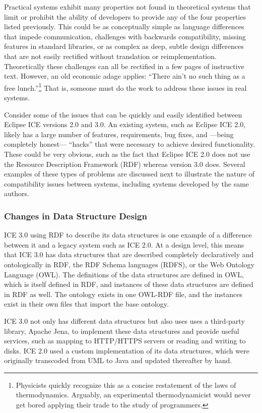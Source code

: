 Practical systems exhibit many properties not found in theoretical systems that
limit or prohibit the ability of developers to provide any of the four
properties listed previously. This could be as conceptually simple as language
differences that impede communication, challenges with backwards compatibility,
missing features in standard libraries, or as complex as deep, subtle design
differences that are not easily rectified without translation or
reimplementation. Theoretically these challenges can all be rectified in a few
pages of instructive text. However, an old economic adage applies:
``There ain't no such thing as a free lunch.''\footnote{Physicists quickly recognize this as a concise
restatement of the laws of thermodynamics. Arguably, an experimental
thermodynamicist would never get bored applying their trade to the study of
programmers.} That is, someone must do the work to address these issues in real
systems.

Consider some of the issues that can be quickly and easily identified between
Eclipse ICE versions 2.0 and 3.0. An existing system, such as Eclipse ICE 2.0,
likely has a large number of features, requirements, bug fixes, and ---being completely
honest--- ``hacks'' that were necessary to achieve desired functionality. These
could be very obvious, such as the fact that Eclipse ICE 2.0 does not use the Resource
Description Framework (RDF) whereas version 3.0 does. Several examples of these
types of problems are discussed next to illustrate the nature of
compatibility issues between systems, including systems developed by the same authors.

\subsubsection{Changes in Data Structure Design}
\label{ice-data}

ICE 3.0 using RDF to describe its data structures is one example of a
difference between it and a legacy system such as ICE 2.0. At a design level,
this means that ICE 3.0 has data structures that are described completely
declaratively and ontologically in RDF, the RDF Schema languages (RDFS), or the
Web Ontology Language (OWL). The definitions of the data structures are defined
in OWL, which is itself defined in RDF, and instances of these data structures
are defined in RDF as well. The ontology exists in one OWL-RDF file, and the
instances exist in their own files that import the base ontology.

ICE 3.0 not only has different data structures but also uses uses a third-party
library, Apache Jena, to implement these data structures and provide useful
services, such as mapping to HTTP/HTTPS servers or reading and writing to
disks. ICE 2.0 used a custom implementation of its data structures, which were
originally transcoded from UML to Java and updated thereafter by hand.

